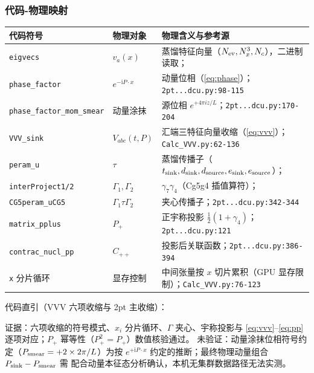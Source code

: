 \documentclass[UTF8]{ctexart}
\begin{document}
\subsubsection{代码-物理映射}
\begin{xltabular}{\textwidth}{llX}
\toprule
\textcolor{map}{代码符号} & 物理对象 & 物理含义与参考源 \\
\midrule
\endhead
\texttt{eigvecs} & $v_a(x)$ & 蒸馏特征向量（$N_{\rm ev},N_x^3,N_c$），二进制读取；\\
\texttt{phase\_factor} & $e^{-\mathrm iP\cdot x}$ & 动量位相（\eqref{eq:phase}）；\texttt{\nolinkurl{2pt...dcu.py:98-115}} \\
\texttt{phase\_factor\_mom\_smear} & 动量涂抹 & 源位相 $e^{+4\pi iz/L}$；\texttt{\nolinkurl{2pt...dcu.py:170-204}} \\
\texttt{VVV\_sink} & $V_{abc}(t,P)$ & 汇端三特征向量收缩（\eqref{eq:vvv}）；\texttt{\nolinkurl{Calc_VVV.py:62-136}} \\
\texttt{peram\_u} & $\tau$ & 蒸馏传播子（$t_{\rm sink},d_{\rm sink},d_{\rm source},e_{\rm sink},e_{\rm source}$）；\\
\texttt{interProject1/2} & $\Gamma_1,\Gamma_2$ & $\gamma_7\gamma_4$（Cg5g4 插值算符）；\\
\texttt{CG5peram\_uCG5} & $\Gamma_1\tau\Gamma_2$ & 夹心传播子；\texttt{\nolinkurl{2pt...dcu.py:342-344}} \\
\texttt{matrix\_pplus} & $P_+$ & 正宇称投影 $\tfrac12(1+\gamma_4)$；\texttt{\nolinkurl{2pt...dcu.py:121}} \\
\texttt{contrac\_nucl\_pp} & $C_{++}$ & 投影后关联函数；\texttt{\nolinkurl{2pt...dcu.py:386-394}} \\
\texttt{x} 分片循环 & 显存控制 & 中间张量按 $x$ 切片累积（GPU 显存限制）；\texttt{\nolinkurl{Calc_VVV.py:76-123}} \\
\bottomrule
\end{xltabular}

代码直引（VVV 六项收缩与 2pt 主收缩）：



\textcolor{evidence}{证据}：六项收缩的符号模式、$x_i$ 分片循环、$\Gamma$ 夹心、宇称投影与
\eqref{eq:vvv}--\eqref{eq:pp} 逐项对应；$P_+$ 幂等性（$P_+^2=P_+$）数值核验通过。
\textcolor{warn}{未验证}：动量涂抹位相符号约定（$P_{\rm smear}=+2\times 2\pi/L$）为按
$e^{+\mathrm i P\cdot x}$ 约定的推断；最终物理动量组合 $P_{\rm sink}-P_{\rm smear}$ 需
配合动量本征态分析确认，本机无集群数据路径无法实测。
\end{document}
